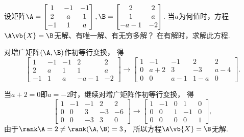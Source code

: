\begin{example}
设矩阵\(\A = \begin{bmatrix}
	1 & -1 & -1 \\
	2 & a & 1 \\
	-1 & 1 & a
\end{bmatrix},
\B = \begin{bmatrix}
	2 & 2 \\
	1 & a \\
	-a-1 & -2
\end{bmatrix}\).
当\(a\)为何值时，方程\(\A\vb{X}=\B\)无解、有唯一解、有无穷多解？
在有解时，求解此方程.
\begin{solution}
对增广矩阵\((\A,\B)\)作初等行变换，
得\begin{equation*}
	\begin{bmatrix}
		1 & -1 & -1 & 2 & 2 \\
		2 & a & 1 & 1 & a \\
		-1 & 1 & a & -a-1 & -2
	\end{bmatrix}
	\to \begin{bmatrix}
		1 & -1 & -1 & 2 & 2 \\
		0 & a+2 & 3 & -3 & a-4 \\
		0 & 0 & a-1 & 1-a & 0
	\end{bmatrix}.
\end{equation*}

当\(a+2=0\)即\(a=-2\)时，继续对增广矩阵作初等行变换，
得\begin{equation*}
	\begin{bmatrix}
		1 & -1 & -1 & 2 & 2 \\
		0 & 0 & 3 & -3 & -6 \\
		0 & 0 & -3 & 3 & 0
	\end{bmatrix}
	\to \begin{bmatrix}
		1 & -1 & 0 & 1 & 0 \\
		0 & 0 & 1 & -1 & 0 \\
		0 & 0 & 0 & 0 & 1
	\end{bmatrix},
\end{equation*}
由于\(\rank\A = 2 \neq \rank(\A,\B) = 3\)，
所以方程\(\A\vb{X}=\B\)无解.


\end{solution}
\end{example}
